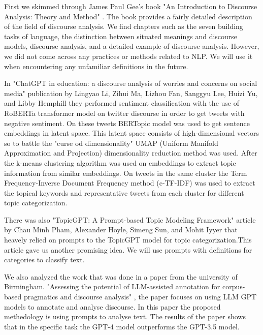 \documentclass[fleqn,moreauthors,10pt]{ds_report}
\begin{document}
    First we skimmed through James Paul Gee's book "An Introduction to Discourse Analysis: Theory and Method" \cite{gee2014introduction}. The book provides a fairly detailed description of the field of discourse analysis. We find chapters such as the seven building tasks of language, the distinction between situated meanings and discourse models, discourse analysis, and a detailed example of discourse analysis. However, we did not come across any practices or methods related to NLP. We will use it when encountering any unfamiliar definitions in the future. 
    
    In "ChatGPT in education: a discourse analysis of worries and concerns on social media" publication by Lingyao Li, Zihui Ma, Lizhou Fan, Sanggyu Lee, Huizi Yu, and Libby Hemphill \cite{li2305chatgpt} they performed sentiment classification with the use of RoBERTa transformer model on twitter discourse in order to get tweets with negative sentiment. On these tweets BERTopic model was used to get sentence embeddings in latent space. This latent space consists of high-dimensional vectors so to battle the "curse od dimensionality" UMAP (Uniform Manifold Approximation and Projection) dimensionality reduction method was used. After the k-means clustering algorithm was used on embeddings to extract topic information from similar embeddings. On tweets in the same cluster the Term Frequency-Inverse Document Frequency method (c-TF-IDF) was used to extract the topical keywords and representative tweets from each cluster for different topic categorization. 
    
    There was also "TopicGPT: A Prompt-based Topic Modeling Framework" article by Chau Minh Pham, Alexander Hoyle, Simeng Sun, and Mohit Iyyer \cite{pham2023topicgpt} that heavely relied on prompts to the TopicGPT model for topic categorization.This article gave us another promising idea. We will use prompts with definitions for categories to classify text.

    We also analyzed the work that was done in a paper from the university of Birmingham. "Assessing the potential of LLM-assisted annotation for corpus-based pragmatics and discourse analysis" \cite{llm2023analysis}, the paper focuses on using LLM GPT models to annotate and analyse discourse. In this paper the proposed methedology is using prompts to analyse text. The results of the paper shows that in the specific task the GPT-4 model outperforms the GPT-3.5 model.


\end{document}
